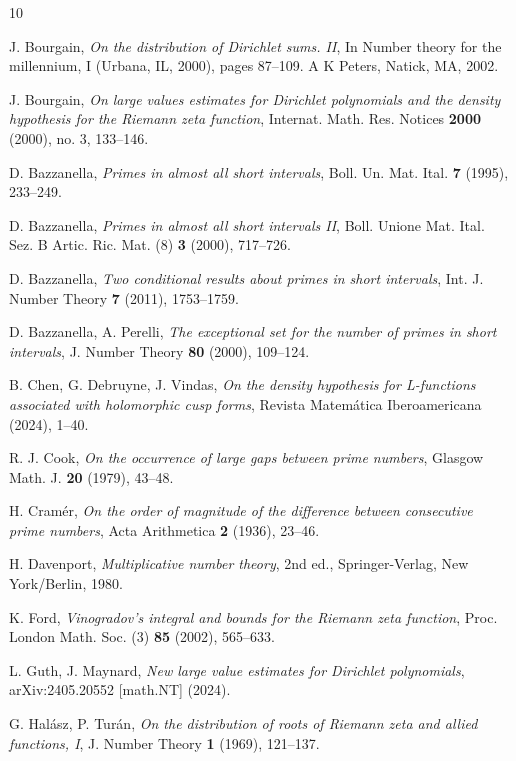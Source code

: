 \documentclass[12pt]{amsart}
\begin{document}
\begin{thebibliography}{10}

J. Bourgain, \emph{On the distribution of Dirichlet sums. II}, In Number theory for the millennium, I (Urbana, IL, 2000), pages 87--109. A K Peters, Natick, MA, 2002.

J. Bourgain, \emph{On large values estimates for Dirichlet polynomials and the density hypothesis for the Riemann zeta function}, Internat. Math. Res. Notices \textbf{2000} (2000), no. 3, 133--146.

D. Bazzanella, \emph{Primes in almost all short intervals}, Boll. Un. Mat. Ital. \textbf{7} (1995), 233--249.

D. Bazzanella, \emph{Primes in almost all short intervals II}, Boll. Unione Mat. Ital. Sez. B Artic. Ric. Mat. (8) \textbf{3} (2000), 717--726.

D. Bazzanella, \emph{Two conditional results about primes in short intervals}, Int. J. Number Theory \textbf{7} (2011), 1753--1759.

D. Bazzanella, A. Perelli, \emph{The exceptional set for the number of primes in short intervals}, J. Number Theory \textbf{80} (2000), 109--124.

B. Chen, G. Debruyne, J. Vindas, \emph{On the density hypothesis for L-functions associated with holomorphic cusp forms}, Revista Matem\'atica Iberoamericana (2024), 1--40.

R. J. Cook, \emph{On the occurrence of large gaps between prime numbers}, Glasgow Math. J. \textbf{20} (1979), 43--48.

H. Cram\'er, \emph{On the order of magnitude of the difference between consecutive prime numbers}, Acta Arithmetica \textbf{2} (1936), 23--46.

H. Davenport, \emph{Multiplicative number theory}, 2nd ed., Springer-Verlag, New York/Berlin, 1980.

K. Ford, \emph{Vinogradov's integral and bounds for the Riemann zeta function}, Proc. London Math. Soc. (3) \textbf{85} (2002), 565--633.

L. Guth, J. Maynard, \emph{New large value estimates for Dirichlet polynomials}, arXiv:2405.20552 [math.NT] (2024).

G. Hal\'asz, P. Tur\'an, \emph{On the distribution of roots of Riemann zeta and allied functions, I}, J. Number Theory \textbf{1} (1969), 121--137.


\end{thebibliography}
\end{document}
